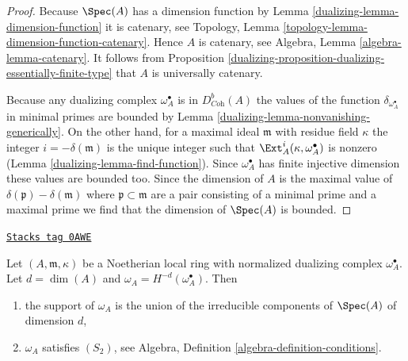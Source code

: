 \begin{proof}

Because $\Spec(A)$ has a dimension function by
Lemma \ref{dualizing-lemma-dimension-function}
it is catenary, see
Topology, Lemma \ref{topology-lemma-dimension-function-catenary}.
Hence $A$ is catenary, see
Algebra, Lemma \ref{algebra-lemma-catenary}.
It follows from
Proposition \ref{dualizing-proposition-dualizing-essentially-finite-type}
that $A$ is universally catenary.

\medskip\noindent
Because any dualizing complex $\omega_A^\bullet$ is
in $D^b_{\textit{Coh}}(A)$ the values of the function
$\delta_{\omega_A^\bullet}$ in minimal primes are bounded by
Lemma \ref{dualizing-lemma-nonvanishing-generically}.
On the other hand, for a maximal ideal $\mathfrak m$ with
residue field $\kappa$ the integer $i = -\delta(\mathfrak m)$
is the unique integer such that
$\Ext_A^i(\kappa, \omega_A^\bullet)$ is nonzero
(Lemma \ref{dualizing-lemma-find-function}).
Since $\omega_A^\bullet$ has finite injective dimension
these values are bounded too. Since the dimension of
$A$ is the maximal value of $\delta(\mathfrak p) - \delta(\mathfrak m)$
where $\mathfrak p \subset \mathfrak m$ are a pair
consisting of a minimal prime and a maximal prime we find that the
dimension of $\Spec(A)$ is bounded.
\end{proof}

\begin{lemma}
\label{dualizing-lemma-depth-dualizing-module}
\href{https://stacks.math.columbia.edu/tag/0AWE}{\texttt{Stacks tag 0AWE}}

Let $(A, \mathfrak m, \kappa)$ be a Noetherian local ring with
normalized dualizing complex $\omega_A^\bullet$. Let $d = \dim(A)$
and $\omega_A = H^{-d}(\omega_A^\bullet)$. Then
\begin{enumerate}
\item the support of $\omega_A$ is the union of the irreducible components
of $\Spec(A)$ of dimension $d$,
\item $\omega_A$ satisfies $(S_2)$, see
Algebra, Definition \ref{algebra-definition-conditions}.
\end{enumerate}
\end{lemma}

